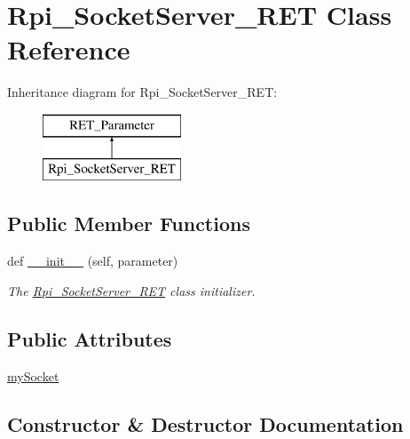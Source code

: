 \hypertarget{a00049}{}\section{Rpi\+\_\+\+Socket\+Server\+\_\+\+R\+ET Class Reference}
\label{a00049}
Inheritance diagram for Rpi\+\_\+\+Socket\+Server\+\_\+\+R\+ET\+:\begin{figure}[H]
\begin{center}
\leavevmode
\includegraphics[height=2.000000cm]{a00049}
\end{center}
\end{figure}
\subsection*{Public Member Functions}
\begin{DoxyCompactItemize}
\item 
def \hyperlink{a00049_a297f3b1ee42e9ff40c0ec84bb5996ea5}{\+\_\+\+\_\+init\+\_\+\+\_\+} (self, parameter)
\begin{DoxyCompactList}\small\item\em The \hyperlink{a00049}{Rpi\+\_\+\+Socket\+Server\+\_\+\+R\+ET} class initializer. \end{DoxyCompactList}\end{DoxyCompactItemize}
\subsection*{Public Attributes}
\begin{DoxyCompactItemize}
\item 
\hyperlink{a00049_ab4dca4dc93d7a4919b7881c73ba5ab1e}{my\+Socket}
\end{DoxyCompactItemize}


\subsection{Constructor \& Destructor Documentation}
\mbox{\label{a00049_a297f3b1ee42e9ff40c0ec84bb5996ea5}} 
